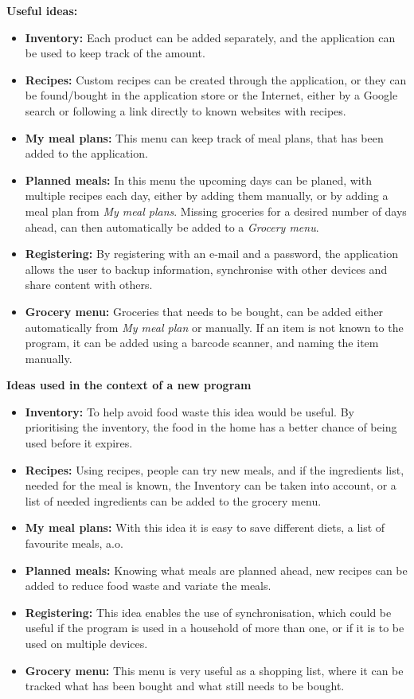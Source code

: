 \textbf{Useful ideas:}
\begin{itemize}
  \item \textbf{Inventory:} Each product can be added separately, and the application can be used to keep track of the amount.
  \item \textbf{Recipes:} Custom recipes can be created through the application, or they can be found/bought in the application store or the Internet, either by a Google search or following a link directly to known websites with recipes.
  \item \textbf{My meal plans:} This menu can keep track of meal plans, that has been added to the application.
  \item \textbf{Planned meals:} In this menu the upcoming days can be planed, with multiple recipes each day, either by adding them manually, or by adding a meal plan from \textit{My meal plans}. Missing groceries for a desired number of days ahead, can then automatically be added to a \textit{Grocery menu}.
  \item \textbf{Registering:} By registering with an e-mail and a password, the application allows the user to backup information, synchronise with other devices and share content with others.
  \item \textbf{Grocery menu:} Groceries that needs to be bought, can be added either automatically from \textit{My meal plan} or manually. If an item is not known to the program, it can be added using a barcode scanner, and naming the item manually.
\end{itemize}

\textbf{Ideas used in the context of a new program}
\begin{itemize}
  \item \textbf{Inventory:} To help avoid food waste this idea would be useful. By prioritising the inventory, the food in the home has a better chance of being used before it expires.
  \item \textbf{Recipes:} Using recipes, people can try new meals, and if the ingredients list, needed for the meal is known, the Inventory can be taken into account, or a list of needed ingredients can be added to the grocery menu.
  \item \textbf{My meal plans:} With this idea it is easy to save different diets, a list of favourite meals, a.o.
  \item \textbf{Planned meals:} Knowing what meals are planned ahead, new recipes can be added to reduce food waste and variate the meals.
  \item \textbf{Registering:} This idea enables the use of synchronisation, which could be useful if the program is used in a household of more than one, or if it is to be used on multiple devices.
  \item \textbf{Grocery menu:} This menu is very useful as a shopping list, where it can be tracked what has been bought and what still needs to be bought.
\end{itemize}

